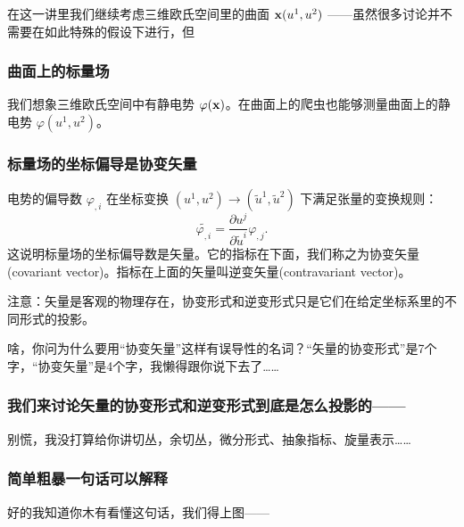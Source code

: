 \documentclass[CJK,13pt]{beamer}
\date{}
\begin{document}
  \bch
{}


\begin{frame}
  在这一讲里我们继续考虑三维欧氏空间里的曲面 ${\mathbf{x}}(u^1, u^2)$ ——虽然很多讨论并不需要在如此特殊的假设下进行，但

  \skiplines

\end{frame}


\begin{frame}
  \frametitle{曲面上的标量场}
  
  我们想象三维欧氏空间中有静电势 $\varphi({\mathbf{x}})$。在曲面上的爬虫也能够测量曲面上的静电势 $\varphi(u^1, u^2)$。

\end{frame}

\begin{frame}
\frametitle{标量场的坐标偏导是协变矢量}

电势的偏导数 $\varphi_{,i}$ 在坐标变换 $(u^1,u^2)\rightarrow (\tilde{u}^1, \tilde{u}^2)$ 下满足张量的变换规则：
$$ \widetilde{\varphi_{,i}} = \frac{\partial u^j}{\partial \tilde{u}^i} \varphi_{,j}.$$
这说明标量场的坐标偏导数是矢量。它的指标在下面，我们称之为{\blue 协变矢量(covariant vector)}。指标在上面的矢量叫{\blue 逆变矢量(contravariant vector)}。

\emini
{}
注意：{\blue 矢量是客观的物理存在，协变形式和逆变形式只是它们在给定坐标系里的不同形式的投影。}

{\scriptsize 啥，你问为什么要用“协变矢量”这样有误导性的名词？“矢量的协变形式”是7个字，“协变矢量”是4个字，我懒得跟你说下去了……}
\emini
\end{frame}


\begin{frame}

  
  \frametitle{我们来讨论矢量的协变形式和逆变形式到底是怎么投影的——}

  
  别慌，我没打算给你讲切丛，余切丛，微分形式、抽象指标、旋量表示……
  
\end{frame}


\begin{frame}
  \frametitle{简单粗暴一句话可以解释}

  \skipline
  
  好的我知道你木有看懂这句话，我们得上图——
\end{frame}
\end{document}
